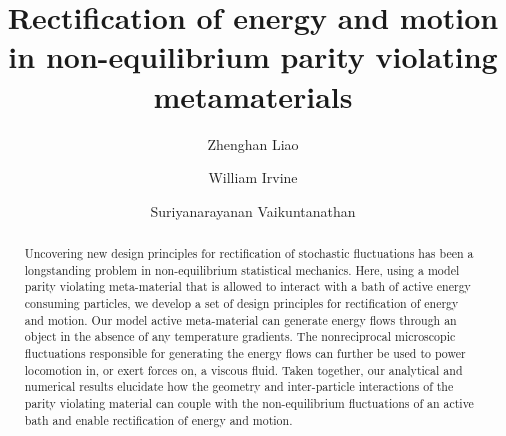 \documentclass[
 preprint,
 preprintnumbers,
 amsmath,amssymb,
 aps,
 pre,
 longbibliography,
 superscriptaddress,
 10pt, twocolumn
]{revtex4-1}
\begin{document}
\newcommand{\eqnname}{Eq.}
\newcommand{\secname}{Sec.}


\title{Rectification of energy and motion in non-equilibrium parity violating metamaterials}


\author{Zhenghan Liao}
\author{William Irvine}
\author{Suriyanarayanan Vaikuntanathan}


\begin{abstract}
Uncovering new design principles for rectification of stochastic fluctuations has been a longstanding problem in non-equilibrium statistical mechanics. Here, using a model parity violating meta-material that is allowed to interact with a bath of active energy consuming particles, we develop a set of design principles for rectification of energy and motion. Our model active meta-material can generate energy flows through an object in the absence of any temperature gradients. The nonreciprocal microscopic fluctuations responsible for generating the energy flows can further be used to power locomotion in, or exert forces on, a viscous fluid. Taken together, our analytical and numerical results elucidate how the geometry and inter-particle interactions of the parity violating material can couple with the non-equilibrium fluctuations of an active bath and enable rectification of energy and motion.  
\end{abstract}

\maketitle
\end{document}
